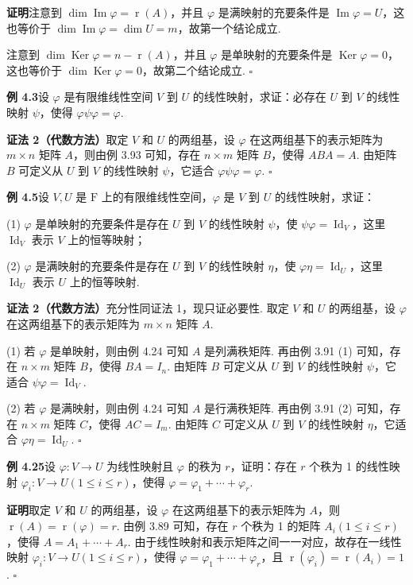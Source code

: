 \documentclass[UTF8,12pt,a4paper,fontset=fandol]{ctexart}
\begin{document}
\noindent\textbf{证明}\quad 注意到 $\dim\operatorname{Im}\varphi=\operatorname{r}(A)$，并且 $\varphi$ 是满映射的充要条件是 $\operatorname{Im}\varphi=U$，这也等价于 $\dim\operatorname{Im}\varphi=\dim U=m$，故第一个结论成立.

注意到 $\dim\operatorname{Ker}\varphi=n-\operatorname{r}(A)$，并且 $\varphi$ 是单映射的充要条件是 $\operatorname{Ker}\varphi=0$，这也等价于 $\dim\operatorname{Ker}\varphi=0$，故第二个结论成立. $\square$

\noindent\textbf{例 4.3}\quad 设 $\varphi$ 是有限维线性空间 $V$ 到 $U$ 的线性映射，求证：必存在 $U$ 到 $V$ 的线性映射 $\psi$，使得 $\varphi\psi\varphi=\varphi$.

\noindent\textbf{证法 2（代数方法）}\quad 取定 $V$ 和 $U$ 的两组基，设 $\varphi$ 在这两组基下的表示矩阵为 $m\times n$ 矩阵 $A$，则由例 3.93 可知，存在 $n\times m$ 矩阵 $B$，使得 $ABA=A$. 由矩阵 $B$ 可定义从 $U$ 到 $V$ 的线性映射 $\psi$，它适合 $\varphi\psi\varphi=\varphi$. $\square$

\noindent\textbf{例 4.5}\quad 设 $V,U$ 是 $\mathrm{F}$ 上的有限维线性空间，$\varphi$ 是 $V$ 到 $U$ 的线性映射，求证：

(1) $\varphi$ 是单映射的充要条件是存在 $U$ 到 $V$ 的线性映射 $\psi$，使 $\psi\varphi=\operatorname{Id}_V$，这里 $\operatorname{Id}_V$ 表示 $V$ 上的恒等映射；

(2) $\varphi$ 是满映射的充要条件是存在 $U$ 到 $V$ 的线性映射 $\eta$，使 $\varphi\eta=\operatorname{Id}_U$，这里 $\operatorname{Id}_U$ 表示 $U$ 上的恒等映射.

\noindent\textbf{证法 2（代数方法）}\quad 充分性同证法 1，现只证必要性. 取定 $V$ 和 $U$ 的两组基，设 $\varphi$ 在这两组基下的表示矩阵为 $m\times n$ 矩阵 $A$.

(1) 若 $\varphi$ 是单映射，则由例 4.24 可知 $A$ 是列满秩矩阵. 再由例 3.91 (1) 可知，存在 $n\times m$ 矩阵 $B$，使得 $BA=I_n$. 由矩阵 $B$ 可定义从 $U$ 到 $V$ 的线性映射 $\psi$，它适合 $\psi\varphi=\operatorname{Id}_V$.

(2) 若 $\varphi$ 是满映射，则由例 4.24 可知 $A$ 是行满秩矩阵. 再由例 3.91 (2) 可知，存在 $n\times m$ 矩阵 $C$，使得 $AC=I_m$. 由矩阵 $C$ 可定义从 $U$ 到 $V$ 的线性映射 $\eta$，它适合 $\varphi\eta=\operatorname{Id}_U$. $\square$

\noindent\textbf{例 4.25}\quad 设 $\varphi:V\to U$ 为线性映射且 $\varphi$ 的秩为 $r$，证明：存在 $r$ 个秩为 1 的线性映射 $\varphi_i:V\to U(1\le i\le r)$，使得 $\varphi=\varphi_1+\cdots+\varphi_r$.

\noindent\textbf{证明}\quad 取定 $V$ 和 $U$ 的两组基，设 $\varphi$ 在这两组基下的表示矩阵为 $A$，则 $\operatorname{r}(A)=\operatorname{r}(\varphi)=r$. 由例 3.89 可知，存在 $r$ 个秩为 1 的矩阵 $A_i(1\le i\le r)$，使得 $A=A_1+\cdots+A_r$. 由于线性映射和表示矩阵之间一一对应，故存在一线性映射 $\varphi_i:V\to U(1\le i\le r)$，使得 $\varphi=\varphi_1+\cdots+\varphi_r$，且 $\operatorname{r}(\varphi_i)=\operatorname{r}(A_i)=1$. $\square$
\end{document}
